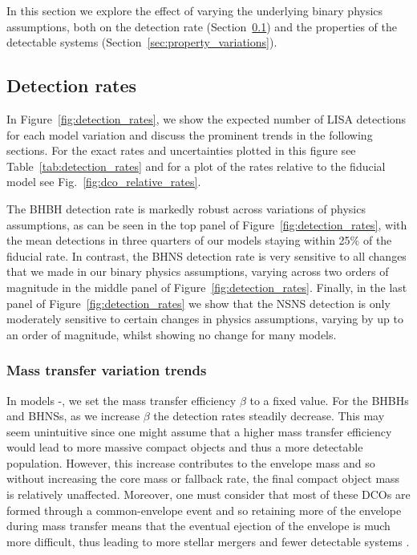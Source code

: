 In this section we explore the effect of varying the underlying binary physics assumptions, both on the detection rate (Section~\ref{sec:detection_rate_analysis}) and the properties of the detectable systems (Section~\ref{sec:property_variations}).

\subsection{Detection rates}\label{sec:detection_rate_analysis}
In Figure~\ref{fig:detection_rates}, we show the expected number of LISA detections for each model variation and discuss the prominent trends in the following sections. For the exact rates and uncertainties plotted in this figure see Table~\ref{tab:detection_rates} and for a plot of the rates relative to the fiducial model see Fig.~\ref{fig:dco_relative_rates}.

The BHBH detection rate is markedly robust across variations of physics assumptions, as can be seen in the top panel of Figure~\ref{fig:detection_rates}, with the mean detections in three quarters of our models staying within 25\% of the fiducial rate. In contrast, the BHNS detection rate is very sensitive to all changes that we made in our binary physics assumptions, varying across two orders of magnitude in the middle panel of Figure~\ref{fig:detection_rates}. Finally, in the last panel of Figure~\ref{fig:detection_rates} we show that the NSNS detection is only moderately sensitive to certain changes in physics assumptions, varying by up to an order of magnitude, whilst showing no change for many models.

\subsubsection{Mass transfer variation trends}

In models \modBetaLow{}-\modBetaHigh{}, we set the mass transfer efficiency $\beta$ to a fixed value. For the BHBHs and BHNSs, as we increase $\beta$ the detection rates steadily decrease. This may seem unintuitive since one might assume that a higher mass transfer efficiency would lead to more massive compact objects and thus a more detectable population. However, this increase contributes to the envelope mass and so without increasing the core mass or fallback rate, the final compact object mass is relatively unaffected. Moreover, one must consider that most of these DCOs are formed through a common-envelope event and so retaining more of the envelope during mass transfer means that the eventual ejection of the envelope is much more difficult, thus leading to more stellar mergers and fewer detectable systems \citep[e.g.][]{Kruckow+2018,Broekgaarden+2021}.


